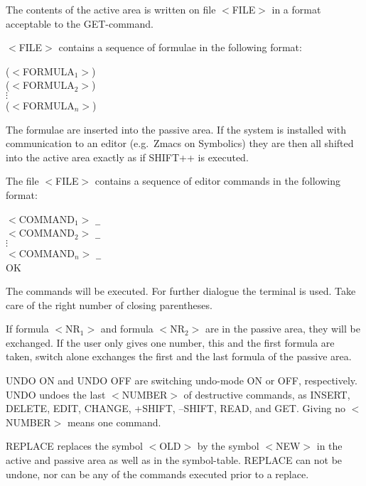 %
{The contents of the active area is written on file $<$FILE$>$ in a format
 acceptable to the GET-command.}

%
{$<$FILE$>$ contains a sequence of formulae in the following format:
\begin{center}
($<$FORMULA$_1$$>$)\\
($<$FORMULA$_2$$>$)\\
$\vdots$\\
($<$FORMULA$_n$$>$)
\end{center}
The formulae are inserted into the passive area. If the system is
installed with communication to an editor (e.g.\ Zmacs on Symbolics)
they are then all shifted into the
active area exactly as if SHIFT++ is executed. }

%
{The file $<$FILE$>$ contains a sequence of editor commands in the following 
format:
\begin{center}
$<$COMMAND$_1$$>$ {\tt \_}\\
$<$COMMAND$_2$$>$ {\tt \_}\\
$\vdots$\\
$<$COMMAND$_n$$>$ {\tt \_}\\
OK
\end{center}
The commands will be executed. For further dialogue the terminal is used.
Take care of the right number of closing parentheses. }

%
{If formula $<$NR$_1$$>$ and formula $<$NR$_2$$>$ are in the passive area,
they will be exchanged. 
If the user only gives one number, this and the first formula are taken,
switch alone exchanges the first and the last formula of the passive area. }

%                
{UNDO ON and UNDO OFF are switching undo-mode ON or OFF, respectively. 
UNDO undoes the last $<$NUMBER$>$ of destructive commands,  as INSERT, 
DELETE, EDIT, CHANGE, +SHIFT, --SHIFT, READ, and GET.
Giving no $<$NUMBER$>$ means one command. }

%                
{REPLACE replaces the symbol $<$OLD$>$ by the symbol $<$NEW$>$ in the active
and 
passive area as well as in the symbol-table. REPLACE can not be undone, nor 
can be any of the commands executed prior to a replace. }

